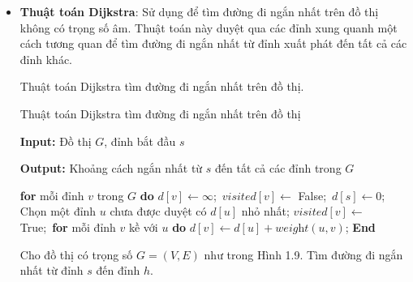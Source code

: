 \documentclass[12pt,oneside,a4paper]{bookAnh1}
\theoremstyle{plain}
\theoremstyle{nonumberplain}
\numberwithin{equation}{chapter}
\begin{document}
{\begin{itemize}
    \item \textbf{Thuật toán Dijkstra}: Sử dụng để tìm đường đi ngắn nhất trên đồ thị không có trọng số âm. Thuật toán này duyệt qua các đỉnh xung quanh một cách tương quan để tìm đường đi ngắn nhất từ đỉnh xuất phát đến tất cả các đỉnh khác.
    
    Thuật toán Dijkstra tìm đường đi ngắn nhất trên đồ thị.
\begin{algorithm}[H]
\caption{Thuật toán Dijkstra tìm đường đi ngắn nhất trên đồ thị}
\textbf{Input: } {Đồ thị $G$, đỉnh bắt đầu $s$}

\textbf{Output: } {Khoảng cách ngắn nhất từ $s$ đến tất cả các đỉnh trong $G$}
\begin{algorithmic}
\State \textbf{  for } {mỗi đỉnh $v$ trong $G$} \textbf{do} 
\State\text{               } $   d[v] \leftarrow \infty$;\
\State \text{               }$   visited[v] \leftarrow$ False;\
    \State $d[s] \leftarrow 0$;\
    \State Chọn một đỉnh $u$ chưa được duyệt có $d[u]$ nhỏ nhất;
    \State \text{               }$   visited[v] \leftarrow$ True;\
        \State \textbf{for} {mỗi đỉnh $v$ kề với $u$} \textbf{do}
            \State $d[v] \leftarrow d[u] + \textit{weight}(u, v)$;
        \EndIf
\EndWhile
\State\textbf{End}
\end{algorithmic}
\end{algorithm}

\begin{example}
Cho đồ thị có trọng số $G=(V,E)$ như trong Hình 1.9. Tìm đường đi ngắn nhất từ đỉnh $s$ đến đỉnh $h$.
\begin{figure}[hpt!]
	\centering
\end{figure}
\end{example}
\end{itemize}}
\end{document}
